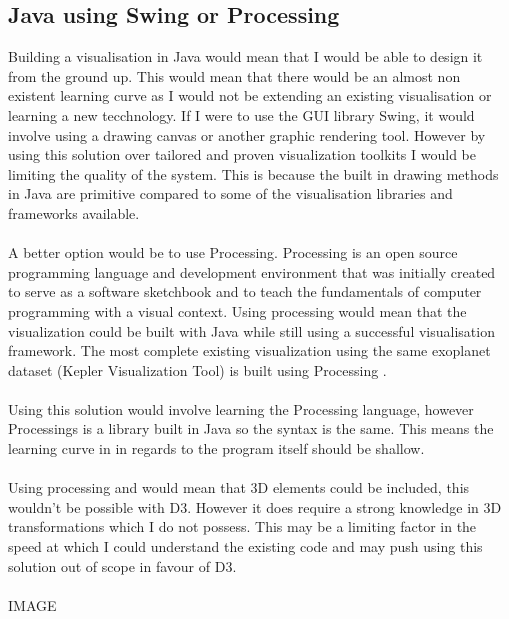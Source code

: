 \documentclass[11pt
              , a4paper
              , twoside
              , openright
              ]{report}
\begin{document}
\subsection{Java using Swing or Processing}
Building a visualisation in Java would mean that I would be able to design it from the ground up. This would mean that there would be an almost non existent learning curve as I would not be extending an existing visualisation or learning a new tecchnology.  If I were to use the GUI library Swing, it would involve using a drawing canvas or another graphic rendering tool. However by using this solution over tailored and  proven visualization toolkits I would be limiting the quality of the system. This is because the built in drawing methods in Java are primitive compared to some of the visualisation libraries and frameworks available.
\\\\
A better option would be to use Processing. Processing is an open source programming language and development environment that was initially created to serve as a software sketchbook and to teach the fundamentals of computer programming with a visual context. Using processing would mean that the visualization could be built with Java while still using a successful visualisation framework. The most complete existing visualization using the same exoplanet dataset (Kepler Visualization Tool) is built using Processing . 
\\\\
Using this solution would involve learning the Processing language, however Processings is a library built in Java so the syntax is the same. This means the learning curve in in regards to the program itself should be shallow.
\\\\
Using processing and would mean that 3D elements could be included, this wouldn’t be possible with D3. However it does require a strong knowledge in 3D transformations which I do not possess. This may be a limiting factor in the speed at which I could understand the existing code and may push using this solution out of scope in favour of D3.
\\\\
IMAGE
\end{document}
